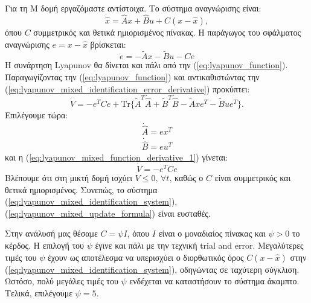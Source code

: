 \documentclass[a4paper,12pt]{article}
\begin{document}
Για τη Μ δομή εργαζόμαστε αντίστοιχα. Το σύστημα αναγνώρισης είναι:
\begin{equation}
    \dot{\hat{x}} = \hat{A}x + \hat{B} u + C(x - \hat{x}),
    \label{eq:lyapunov_mixed_identification_system}
\end{equation}
όπου $C$ συμμετρικός και θετικά ημιορισμένος πίνακας. Η παράγωγος του σφάλματος αναγνώρισης $e = x - \hat{x}$ 
βρίσκεται:
\begin{equation}
    \dot{e} = -\tilde{A}x - \tilde{B}u - Ce
    \label{eq:lyapunov_mixed_identification_error_derivative}
\end{equation}
Η συνάρτηση Lyapunov θα δίνεται και πάλι από την 
(\ref{eq:lyapunov_function}). Παραγωγίζοντας την (\ref{eq:lyapunov_function}) και αντικαθιστώντας
την (\ref{eq:lyapunov_mixed_identification_error_derivative}) προκύπτει:
\begin{equation}
    \dot{V} = -e^TCe + \mathrm{Tr}\{\tilde{A}^T\dot{\hat{A}} + \tilde{B}^T\dot{\hat{B}} - 
    \tilde{A}xe^T - \tilde{B}ue^T\}.
    \label{eq:lyapunov_mixed_function_derivative_1}  
\end{equation}
Επιλέγουμε τώρα:
\begin{equation}
    \begin{aligned}
        \dot{\hat{A}} = ex^T \\ 
        \dot{\hat{B}} = eu^T
    \end{aligned}
    \label{eq:lyapunov_mixed_update_formula}
\end{equation}
και η (\ref{eq:lyapunov_mixed_function_derivative_1}) γίνεται:
\begin{equation}
    \dot{V} = -e^TCe
    \label{eq:lyapunov_mixed_function_derivative_2}
\end{equation}
Βλέπουμε ότι στη μικτή δομή ισχύει $\dot{V} \leq 0, \, \forall t$, καθώς ο $C$ είναι συμμετρικός και θετικά
ημιορισμένος. Συνεπώς, το σύστημα (\ref{eq:lyapunov_mixed_identification_system}), 
(\ref{eq:lyapunov_mixed_update_formula}) είναι ευσταθές.

Στην ανάλυσή μας θέσαμε $C = \psi I$, όπου $I$ είναι ο μοναδιαίος πίνακας και $\psi > 0$ το κέρδος. 
Η επιλογή του $\psi$ έγινε και πάλι με την τεχνική 
trial and error. Μεγαλύτερες τιμές του $\psi$ έχουν ως 
αποτέλεσμα να υπερισχύει ο διορθωτικός όρος $C(x - \hat{x})$ στην 
(\ref{eq:lyapunov_mixed_identification_system}), οδηγώντας σε ταχύτερη σύγκλιση. Ωστόσο, πολύ μεγάλες τιμές 
του $\psi$ ενδέχεται να καταστήσουν το σύστημα άκαμπτο. Τελικά, επιλέγουμε $\psi = 5$.
\end{document}
